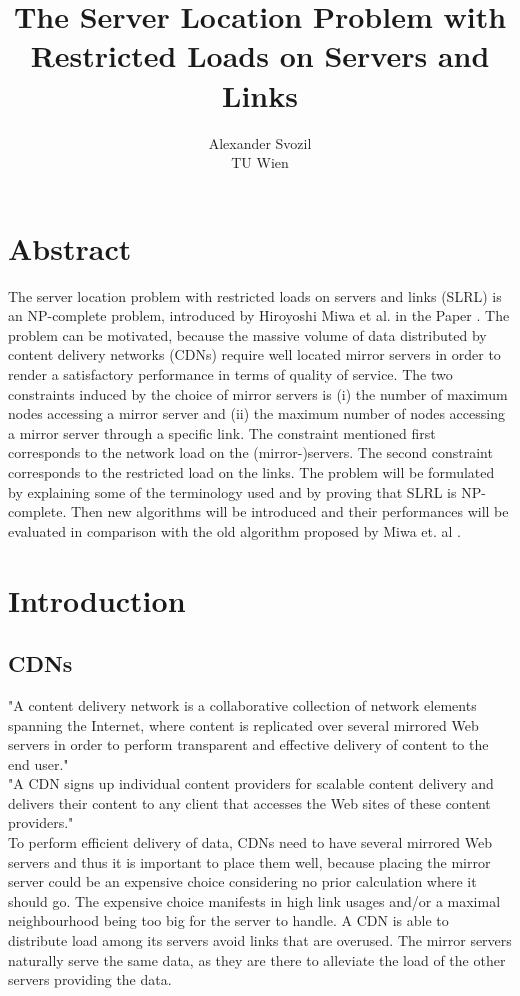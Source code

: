 \documentclass [12pt]{article}
\begin{document}
\author{Alexander Svozil\\ TU Wien}
\title{The Server Location Problem with Restricted Loads 
on Servers and Links}

\maketitle
\newpage

\section{Abstract}
The server location problem with restricted loads on servers and links (SLRL) is an NP-complete
problem, introduced by Hiroyoshi Miwa et al. in the Paper \cite{mirrorserver}. The problem 
can be motivated, because the massive volume of data distributed by content delivery networks (CDNs) 
require well located mirror servers in order to render a satisfactory performance in terms of quality of service.
The two constraints induced by the choice of mirror servers is (i) the number of maximum nodes
accessing a mirror server and (ii) the maximum number of nodes accessing a mirror server 
through a specific link. The constraint mentioned first corresponds to the network load on
the (mirror-)servers. The second constraint corresponds to the restricted load on the links.
The problem will be formulated by explaining some of the terminology used and by proving that SLRL is NP-complete.
Then new algorithms will be introduced and their performances will be evaluated in comparison with the old algorithm proposed 
by Miwa et. al \cite{mirrorserver}. 


\newpage
\tableofcontents
\newpage


\section{Introduction}
\subsection {CDNs}
"A content delivery network is a collaborative collection of network elements spanning
the Internet, where content is replicated over several mirrored Web servers in order
to perform transparent and effective delivery of content to the end user."\cite[p. 3]{Buyya:2008:CDN:1457653}\\
"A CDN signs up individual content providers for scalable content delivery and delivers
their content to any client that accesses the Web sites of these content providers."\cite[p. 193]{Rabinovich:2002:WCR:507107}\\
To perform efficient delivery of data, CDNs need to have several mirrored Web servers
and thus it is important to place them well, because placing the mirror server 
could be an expensive choice considering no prior calculation where it should go. 
The expensive choice manifests in high link usages and/or a maximal neighbourhood being
too big for the server to handle. A CDN is able to distribute load among its servers avoid
links that are overused.
The mirror servers naturally serve the same data, as they are there to alleviate the 
load of the other servers providing the data.
\end{document}
